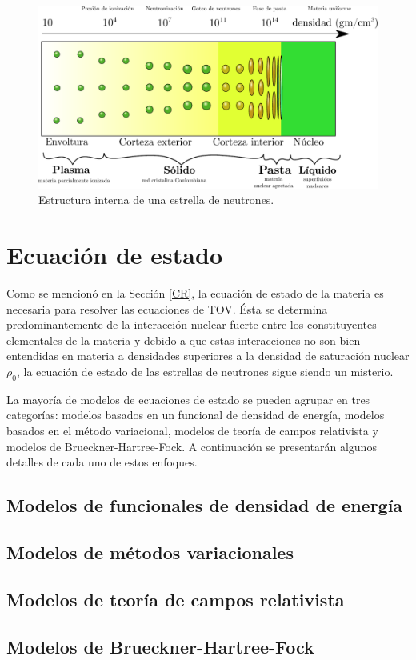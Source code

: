 \begin{figure}[H]
    \centering
    \includegraphics[width=420pt]{figures/Density.pdf}
    \caption[Estructura interna de una estrella de neutrones]{Estructura interna de una estrella de neutrones.\protect\footnotemark}
    \label{NSS}
\end{figure}

\section{Ecuación de estado}

Como se mencionó en la Sección \ref{CR}, la ecuación de estado de la materia es necesaria para resolver las ecuaciones de TOV. Ésta se determina predominantemente de la interacción nuclear fuerte entre los constituyentes elementales de la materia y debido a que estas interacciones no son bien entendidas en materia a densidades superiores a la densidad de saturación nuclear $\rho_0$, la ecuación de estado de las estrellas de neutrones sigue siendo un misterio.

La mayoría de modelos de ecuaciones de estado se pueden agrupar en tres categorías: modelos basados en un funcional de densidad de energía, modelos basados en el método variacional, modelos de teoría de campos relativista y modelos de Brueckner-Hartree-Fock. A continuación se presentarán algunos detalles de cada uno de estos enfoques.

\subsection{Modelos de funcionales de densidad de energía}
\subsection{Modelos de métodos variacionales}
\subsection{Modelos de teoría de campos relativista}
\subsection{Modelos de Brueckner-Hartree-Fock}